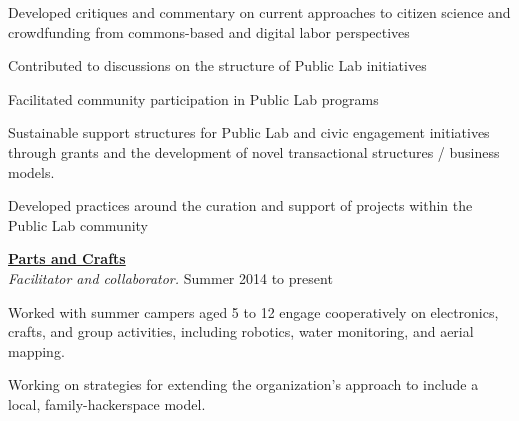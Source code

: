 \documentclass[10pt]{article}
\newcommand{\blankline}{\quad\pagebreak[3]}
\newcommand{\halfblankline}{\quad\vspace{-0.5\baselineskip}\pagebreak[3]}
\begin{document}
\begin{innerlist}
\item Developed critiques and commentary on current approaches to citizen science and crowdfunding from commons-based and digital labor perspectives
\item Contributed to discussions on the structure of Public Lab initiatives
\item Facilitated community participation in Public Lab programs
\item Sustainable support structures for Public Lab and civic engagement initiatives through grants and the development of novel transactional structures / business models.
\item Developed practices around the curation and support of projects within the Public Lab community

\end{innerlist}
   
\blankline

\href{http://partsandcrafts.org}{\textbf{Parts and Crafts}} \\
\emph{Facilitator and collaborator.}  \hfill {Summer 2014 to present }

\halfblankline

\begin{innerlist}
\item Worked with summer campers aged 5 to 12 engage cooperatively on electronics, crafts, and group activities, including robotics, water monitoring, and aerial mapping. 
\item Working on strategies for extending the organization's approach to include a local, family-hackerspace model.
   
\end{innerlist}

\blankline
\end{document}
